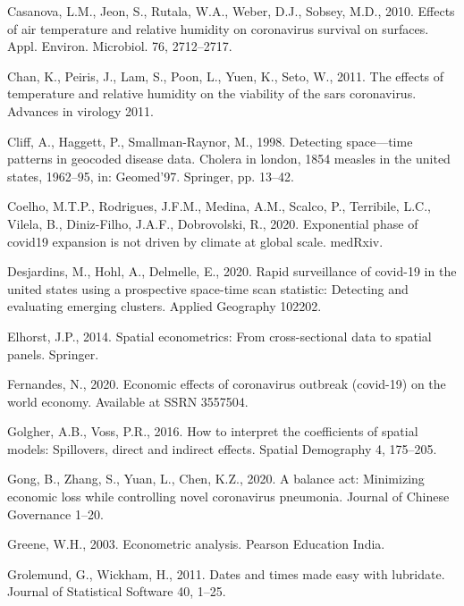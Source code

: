 \documentclass[]{elsarticle} %
\begin{document}
\leavevmode\hypertarget{ref-Casanova2010effects}{}%
Casanova, L.M., Jeon, S., Rutala, W.A., Weber, D.J., Sobsey, M.D., 2010.
Effects of air temperature and relative humidity on coronavirus survival
on surfaces. Appl. Environ. Microbiol. 76, 2712--2717.

\leavevmode\hypertarget{ref-Chan2011effects}{}%
Chan, K., Peiris, J., Lam, S., Poon, L., Yuen, K., Seto, W., 2011. The
effects of temperature and relative humidity on the viability of the
sars coronavirus. Advances in virology 2011.

\leavevmode\hypertarget{ref-Cliff1998detecting}{}%
Cliff, A., Haggett, P., Smallman-Raynor, M., 1998. Detecting
space---time patterns in geocoded disease data. Cholera in london, 1854
measles in the united states, 1962--95, in: Geomed'97. Springer, pp.
13--42.

\leavevmode\hypertarget{ref-Coelho2020exponential}{}%
Coelho, M.T.P., Rodrigues, J.F.M., Medina, A.M., Scalco, P., Terribile,
L.C., Vilela, B., Diniz-Filho, J.A.F., Dobrovolski, R., 2020.
Exponential phase of covid19 expansion is not driven by climate at
global scale. medRxiv.

\leavevmode\hypertarget{ref-Desjardins2020rapid}{}%
Desjardins, M., Hohl, A., Delmelle, E., 2020. Rapid surveillance of
covid-19 in the united states using a prospective space-time scan
statistic: Detecting and evaluating emerging clusters. Applied Geography
102202.

\leavevmode\hypertarget{ref-Elhorst2014spatial}{}%
Elhorst, J.P., 2014. Spatial econometrics: From cross-sectional data to
spatial panels. Springer.

\leavevmode\hypertarget{ref-Fernandes2020economic}{}%
Fernandes, N., 2020. Economic effects of coronavirus outbreak (covid-19)
on the world economy. Available at SSRN 3557504.

\leavevmode\hypertarget{ref-Golgher2016interpret}{}%
Golgher, A.B., Voss, P.R., 2016. How to interpret the coefficients of
spatial models: Spillovers, direct and indirect effects. Spatial
Demography 4, 175--205.

\leavevmode\hypertarget{ref-Gong2020balance}{}%
Gong, B., Zhang, S., Yuan, L., Chen, K.Z., 2020. A balance act:
Minimizing economic loss while controlling novel coronavirus pneumonia.
Journal of Chinese Governance 1--20.

\leavevmode\hypertarget{ref-Greene2003econometric}{}%
Greene, W.H., 2003. Econometric analysis. Pearson Education India.

\leavevmode\hypertarget{ref-Grolemund2011dates}{}%
Grolemund, G., Wickham, H., 2011. Dates and times made easy with
lubridate. Journal of Statistical Software 40, 1--25.
\end{document}
